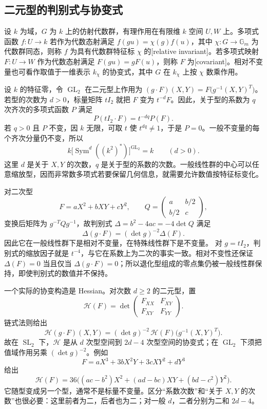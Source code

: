\subsection{二元型的判别式与协变式}
\label{b5:subsec:2205:04}

\begin{definition}\label{b5:def:relative-invariant-covariant}
	设 \(k\) 为域，\(G\) 为 \(k\) 上的仿射代数群，有理作用在有限维 \(k\) 空间 \(U,W\) 上。多项式函数 \(f:U\to k\) 若作为代数态射满足 \(f(gu)=\chi(g)f(u)\)，其中 \(\chi:G\to\mathbb G_m\) 为代数群同态，则称 \(f\) 为具有代数群特征标 \(\chi\) 的[relative invariant]。若多项式映射 \(F:U\to W\) 作为代数态射满足 \(F(gu)=gF(u)\)，则称 \(F\) 为[covariant]。相对不变量也可看作取值于一维表示 \(k_\chi\) 的协变式，其中 \(G\) 在 \(k_\chi\) 上按 \(\chi\) 数乘作用。
\end{definition}

设 \(k\) 的特征零，令 \(\operatorname{GL}_2\) 在二元型上作用为 \((g\cdot F)(X,Y)=F\bigl(g^{-1}(X,Y)^T\bigr)\)。若型的次数为 \(d>0\)，标量矩阵 \(tI_2\) 就把 \(F\) 变为 \(t^{-d}F\)。因此，关于型的系数为 \(q\) 次齐次的多项式函数 \(P\) 满足
\[
	P(tI_2\cdot F)=t^{-dq}P(F).
\]
若 \(q>0\) 且 \(P\) 不变，因 \(k\) 无限，可取 \(t\) 使 \(t^{dq}\ne1\)，于是 \(P=0\)。一般不变量的每个齐次分量仍不变，所以
\[
	k\bigl[\operatorname{Sym}^d((k^2)^*)\bigr]^{\operatorname{GL}_2}=k \qquad(d>0).
\]
这里 \(d\) 是关于 \(X,Y\) 的次数，\(q\) 是关于型的系数的次数。一般线性群的中心可以任意缩放型，因而非常数多项式若要保留几何信息，就需要允许数值按特征标变化。

\ProseParagraphBreak
对二次型
\[
	F=aX^2+bXY+cY^2,\qquad
	Q=\begin{pmatrix}a&b/2\\b/2&c\end{pmatrix},
\]
变换后矩阵为 \(g^{-T}Qg^{-1}\)，故判别式 \(\Delta=b^2-4ac=-4\det Q\) 满足
\[
	\Delta(g\cdot F)=(\det g)^{-2}\Delta(F).
\]
因此它在一般线性群下是相对不变量，在特殊线性群下是不变量。 对 \(g=tI_2\)，判别式的缩放因子就是 \(t^{-4}\)，与它在系数上为二次的事实一致。相对不变性还保证 \(\Delta(F)=0\) 当且仅当 \(\Delta(g\cdot F)=0\)；所以退化型组成的零点集仍被一般线性群保持，即使判别式的数值并不保持。

\ProseParagraphBreak
一个实际的协变构造是 Hessian。对次数 \(d\ge2\) 的二元型，置
\[
	\mathcal H(F)=
	\det\begin{pmatrix}F_{XX}&F_{XY}\\F_{XY}&F_{YY}\end{pmatrix}.
\]
链式法则给出
\[
	\mathcal H(g\cdot F)(X,Y) =(\det g)^{-2}\, \mathcal H(F)\bigl(g^{-1}(X,Y)^T\bigr).
\]
故在 \(\operatorname{SL}_2\) 下，\(\mathcal H\) 是从 \(d\) 次型空间到 \(2d-4\) 次型空间的协变式；在 \(\operatorname{GL}_2\) 下须把值域作用另乘 \((\det g)^{-2}\)。例如
\[
	F=aX^3+3bX^2Y+3cXY^2+dY^3
\]
给出
\[
	\mathcal H(F)=36\bigl((ac-b^2)X^2+(ad-bc)XY+(bd-c^2)Y^2\bigr).
\]
它随型变成另一个型，通常不是标量不变量。区分“系数次数”和“关于 \(X,Y\) 的次数”也很必要：这里前者为二，后者也为二；对一般 \(d\)，二者分别为二和 \(2d-4\)。
